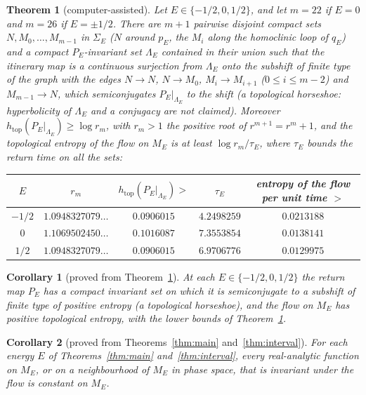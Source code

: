 \documentclass[11pt]{article}
\newtheorem{theorem}{Theorem}
\newtheorem{corollary}{Corollary}
\theoremstyle{definition}
\newcommand{\htop}{h_{\mathrm{top}}}
\begin{document}
\begin{theorem}[computer-assisted]\label{thm:horseshoe}
Let $E \in \{-1/2, 0, 1/2\}$, and let $m = 22$ if $E = 0$ and $m = 26$ if $E = \pm1/2$. There are $m + 1$ pairwise disjoint compact sets $N, M_0, \ldots, M_{m-1}$ in $\Sigma_E$ ($N$ around $p_E$, the $M_i$ along the homoclinic loop of $q_E$) and a compact $P_E$-invariant set $\Lambda_E$ contained in their union such that the itinerary map is a continuous surjection from $\Lambda_E$ onto the subshift of finite type of the graph with the edges $N \to N$, $N \to M_0$, $M_i \to M_{i+1}$ ($0 \le i \le m - 2$) and $M_{m-1} \to N$, which semiconjugates $P_E|_{\Lambda_E}$ to the shift (a topological horseshoe: hyperbolicity of $\Lambda_E$ and a conjugacy are not claimed). Moreover $\htop(P_E|_{\Lambda_E}) \ge \log r_m$, with $r_m > 1$ the positive root of $r^{m+1} = r^m + 1$, and the topological entropy of the flow on $M_E$ is at least $\log r_m/\tau_E$, where $\tau_E$ bounds the return time on all the sets:
\begin{center}\small
\begin{tabular}{@{}ccccc@{}}
\toprule
$E$ & $r_m$ & $\htop(P_E|_{\Lambda_E}) >$ & $\tau_E$ & entropy of the flow per unit time $>$ \\
\midrule
$-1/2$ & $1.0948327079\ldots$ & $0.0906015$ & $4.2498259$ & $0.0213188$ \\
$0$ & $1.1069502450\ldots$ & $0.1016087$ & $7.3553854$ & $0.0138141$ \\
$1/2$ & $1.0948327079\ldots$ & $0.0906015$ & $6.9706776$ & $0.0129975$ \\
\bottomrule
\end{tabular}
\end{center}
\end{theorem}

\begin{corollary}[proved from Theorem~\ref{thm:horseshoe}]\label{cor:horseshoe}
At each $E \in \{-1/2, 0, 1/2\}$ the return map $P_E$ has a compact invariant set on which it is semiconjugate to a subshift of finite type of positive entropy (a topological horseshoe), and the flow on $M_E$ has positive topological entropy, with the lower bounds of Theorem~\ref{thm:horseshoe}.
\end{corollary}

\begin{corollary}[proved from Theorems~\ref{thm:main} and~\ref{thm:interval}]\label{cor:level}
For each energy $E$ of Theorems~\ref{thm:main} and~\ref{thm:interval}, every real-analytic function on $M_E$, or on a neighbourhood of $M_E$ in phase space, that is invariant under the flow is constant on $M_E$.
\end{corollary}
\end{document}
